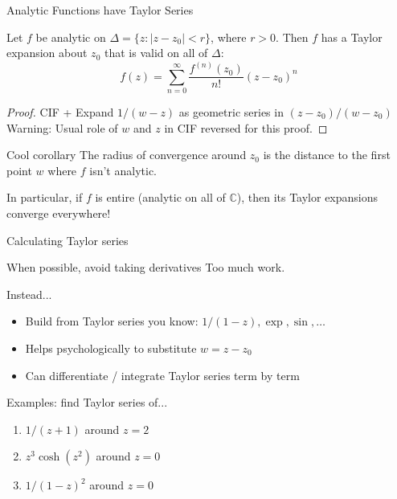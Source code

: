 \documentclass{beamer}
\newcommand{\C}{\mathbb{C}}
\begin{document}
\begin{frame}{Analytic Functions have Taylor Series}
\begin{theorem} Let $f$ be analytic on $\Delta=\{z : |z-z_0|<r\}$, where $r>0$.  Then $f$ has a Taylor expansion about $z_0$ that is valid on all of $\Delta$: 
$$f(z)=\sum_{n=0}^\infty \frac{f^{(n)}(z_0)}{n!}(z-z_0)^n$$
\end{theorem}
\begin{proof}
CIF +  Expand $1/(w-z)$ as geometric series in $(z-z_0)/(w-z_0)$\\
\alert{Warning:} Usual role of $w$ and $z$ in CIF reversed for this proof.
\end{proof}

\begin{block}{Cool corollary}
The radius of convergence around $z_0$ is the distance to the first point $w$ where $f$ isn't analytic.

In particular, if $f$ is entire (analytic on all of $\C$), then its Taylor expansions converge everywhere!
\end{block}
\end{frame}

\begin{frame}{Calculating Taylor series}
\begin{block}{When possible, avoid taking derivatives}
Too much work.
\end{block}

\begin{block}{Instead...}
\begin{itemize}
    \item Build from Taylor series you know: $1/(1-z), \exp, \sin,\dots$
    \item Helps psychologically to substitute $w=z-z_0$
    \item Can differentiate / integrate Taylor series term by term
\end{itemize}
\end{block}
\begin{block}{Examples: find Taylor series of...}
\begin{enumerate}
    \item $1/(z+1)$ around $z=2$
    \item $z^3\cosh(z^2)$ around $z=0$
    \item $1/(1-z)^2$ around $z=0$ 
    \end{enumerate}

\end{block}


\end{frame}
\end{document}
